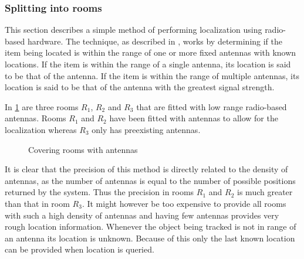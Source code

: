 \subsubsection{Splitting into rooms}\label{rooms}
This section describes a simple method of performing localization using radio-based hardware.
The technique, as described in \citet[Section II.C Proximity]{wireless_survey}, works by determining if the item being located is within the range of one or more fixed antennas with known locations.
If the item is within the range of a single antenna, its location is said to be that of the antenna.
If the item is within the range of multiple antennas, its location is said to be that of the antenna with the greatest signal strength.

In \cref{rooms:fig:cover} are three rooms $R_1$, $R_2$ and $R_3$ that are fitted with low range radio-based antennas.
Rooms $R_1$ and $R_2$ have been fitted with antennas to allow for the localization whereas $R_3$ only has preexisting antennas.

\begin{figure}[h]
\centering

\caption{Covering rooms with antennas}
\label{rooms:fig:cover}
\end{figure}

It is clear that the precision of this method is directly related to the density of antennas, as the number of antennas is equal to the number of possible positions returned by the system.
Thus the precision in rooms $R_1$ and $R_2$ is much greater than that in room $R_3$.
It might however be too expensive to provide all rooms with such a high density of antennas and having few antennas provides very rough location information.
Whenever the object being tracked is not in range of an antenna its location is unknown.
Because of this only the last known location can be provided when location is queried.


